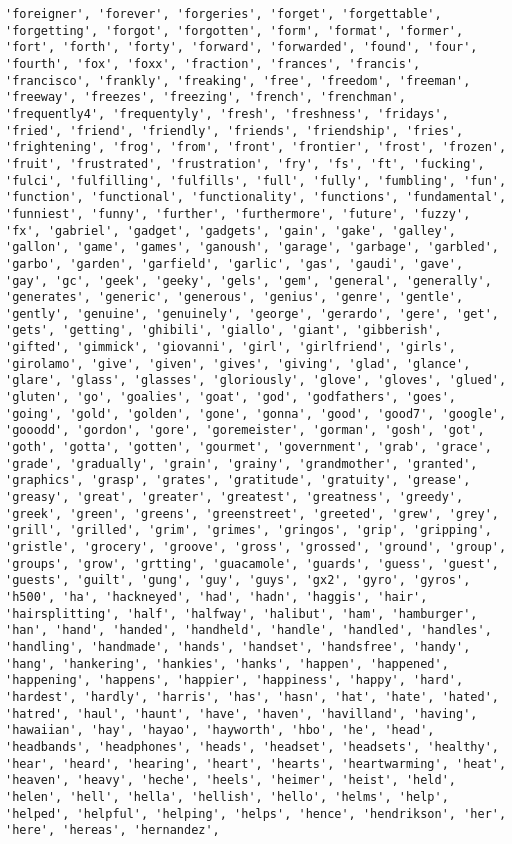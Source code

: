 \documentclass[11pt]{article}
\begin{document}
\begin{Verbatim}[commandchars=\\\{\}]
'foreigner', 'forever', 'forgeries', 'forget', 'forgettable', 'forgetting', 'forgot', 'forgotten', 'form', 'format', 'former', 'fort', 'forth', 'forty', 'forward', 'forwarded', 'found', 'four', 'fourth', 'fox', 'foxx', 'fraction', 'frances', 'francis', 'francisco', 'frankly', 'freaking', 'free', 'freedom', 'freeman', 'freeway', 'freezes', 'freezing', 'french', 'frenchman', 'frequently4', 'frequentyly', 'fresh', 'freshness', 'fridays', 'fried', 'friend', 'friendly', 'friends', 'friendship', 'fries', 'frightening', 'frog', 'from', 'front', 'frontier', 'frost', 'frozen', 'fruit', 'frustrated', 'frustration', 'fry', 'fs', 'ft', 'fucking', 'fulci', 'fulfilling', 'fulfills', 'full', 'fully', 'fumbling', 'fun', 'function', 'functional', 'functionality', 'functions', 'fundamental', 'funniest', 'funny', 'further', 'furthermore', 'future', 'fuzzy', 'fx', 'gabriel', 'gadget', 'gadgets', 'gain', 'gake', 'galley', 'gallon', 'game', 'games', 'ganoush', 'garage', 'garbage', 'garbled', 'garbo', 'garden', 'garfield', 'garlic', 'gas', 'gaudi', 'gave', 'gay', 'gc', 'geek', 'geeky', 'gels', 'gem', 'general', 'generally', 'generates', 'generic', 'generous', 'genius', 'genre', 'gentle', 'gently', 'genuine', 'genuinely', 'george', 'gerardo', 'gere', 'get', 'gets', 'getting', 'ghibili', 'giallo', 'giant', 'gibberish', 'gifted', 'gimmick', 'giovanni', 'girl', 'girlfriend', 'girls', 'girolamo', 'give', 'given', 'gives', 'giving', 'glad', 'glance', 'glare', 'glass', 'glasses', 'gloriously', 'glove', 'gloves', 'glued', 'gluten', 'go', 'goalies', 'goat', 'god', 'godfathers', 'goes', 'going', 'gold', 'golden', 'gone', 'gonna', 'good', 'good7', 'google', 'gooodd', 'gordon', 'gore', 'goremeister', 'gorman', 'gosh', 'got', 'goth', 'gotta', 'gotten', 'gourmet', 'government', 'grab', 'grace', 'grade', 'gradually', 'grain', 'grainy', 'grandmother', 'granted', 'graphics', 'grasp', 'grates', 'gratitude', 'gratuity', 'grease', 'greasy', 'great', 'greater', 'greatest', 'greatness', 'greedy', 'greek', 'green', 'greens', 'greenstreet', 'greeted', 'grew', 'grey', 'grill', 'grilled', 'grim', 'grimes', 'gringos', 'grip', 'gripping', 'gristle', 'grocery', 'groove', 'gross', 'grossed', 'ground', 'group', 'groups', 'grow', 'grtting', 'guacamole', 'guards', 'guess', 'guest', 'guests', 'guilt', 'gung', 'guy', 'guys', 'gx2', 'gyro', 'gyros', 'h500', 'ha', 'hackneyed', 'had', 'hadn', 'haggis', 'hair', 'hairsplitting', 'half', 'halfway', 'halibut', 'ham', 'hamburger', 'han', 'hand', 'handed', 'handheld', 'handle', 'handled', 'handles', 'handling', 'handmade', 'hands', 'handset', 'handsfree', 'handy', 'hang', 'hankering', 'hankies', 'hanks', 'happen', 'happened', 'happening', 'happens', 'happier', 'happiness', 'happy', 'hard', 'hardest', 'hardly', 'harris', 'has', 'hasn', 'hat', 'hate', 'hated', 'hatred', 'haul', 'haunt', 'have', 'haven', 'havilland', 'having', 'hawaiian', 'hay', 'hayao', 'hayworth', 'hbo', 'he', 'head', 'headbands', 'headphones', 'heads', 'headset', 'headsets', 'healthy', 'hear', 'heard', 'hearing', 'heart', 'hearts', 'heartwarming', 'heat', 'heaven', 'heavy', 'heche', 'heels', 'heimer', 'heist', 'held', 'helen', 'hell', 'hella', 'hellish', 'hello', 'helms', 'help', 'helped', 'helpful', 'helping', 'helps', 'hence', 'hendrikson', 'her', 'here', 'hereas', 'hernandez', 
\end{Verbatim}
\end{document}
